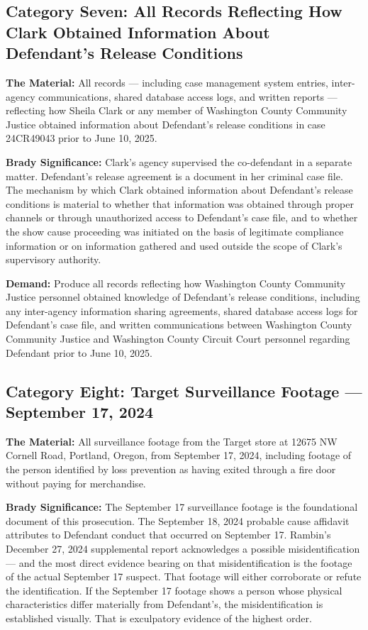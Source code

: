 \documentclass[12pt,letterpaper]{extarticle}
\begin{document}
	\subsection{Category Seven: All Records Reflecting How Clark Obtained Information
		About Defendant's Release Conditions}
	
	\textbf{The Material:} All records --- including case management system entries,
	inter-agency communications, shared database access logs, and written reports ---
	reflecting how Sheila Clark or any member of Washington County Community Justice
	obtained information about Defendant's release conditions in case 24CR49043 prior
	to June 10, 2025.
	
	\textbf{Brady Significance:} Clark's agency supervised the co-defendant in a
	separate matter. Defendant's release agreement is a document in her criminal case
	file. The mechanism by which Clark obtained information about Defendant's release
	conditions is material to whether that information was obtained through proper
	channels or through unauthorized access to Defendant's case file, and to whether
	the show cause proceeding was initiated on the basis of legitimate compliance
	information or on information gathered and used outside the scope of Clark's
	supervisory authority.
	
	\textbf{Demand:} Produce all records reflecting how Washington County Community
	Justice personnel obtained knowledge of Defendant's release conditions, including
	any inter-agency information sharing agreements, shared database access logs for
	Defendant's case file, and written communications between Washington County
	Community Justice and Washington County Circuit Court personnel regarding Defendant
	prior to June 10, 2025.
	
	\subsection{Category Eight: Target Surveillance Footage --- September 17, 2024}
	
	\textbf{The Material:} All surveillance footage from the Target store at 12675 NW
	Cornell Road, Portland, Oregon, from September 17, 2024, including footage of the
	person identified by loss prevention as having exited through a fire door without
	paying for merchandise.
	
	\textbf{Brady Significance:} The September 17 surveillance footage is the
	foundational document of this prosecution. The September 18, 2024 probable cause
	affidavit attributes to Defendant conduct that occurred on September 17. Rambin's
	December 27, 2024 supplemental report acknowledges a possible misidentification ---
	and the most direct evidence bearing on that misidentification is the footage of
	the actual September 17 suspect. That footage will either corroborate or refute the
	identification. If the September 17 footage shows a person whose physical
	characteristics differ materially from Defendant's, the misidentification is
	established visually. That is exculpatory evidence of the highest order.
	
\end{document}
